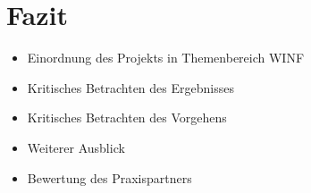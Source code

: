 \documentclass[
    type=Projektarbeit,
    status=draft, %
    language=german, %
    bibengine=bibtex,
]{unibwm-inf-thesis}
\begin{document}
   \chapter{Fazit}

    \begin{itemize}
        \item Einordnung des Projekts in Themenbereich WINF
        \item Kritisches Betrachten des Ergebnisses
        \item Kritisches Betrachten des Vorgehens
        \item Weiterer Ausblick
        \item Bewertung des Praxispartners
    \end{itemize}




    
    \backmatter
    
    
    
\end{document}
